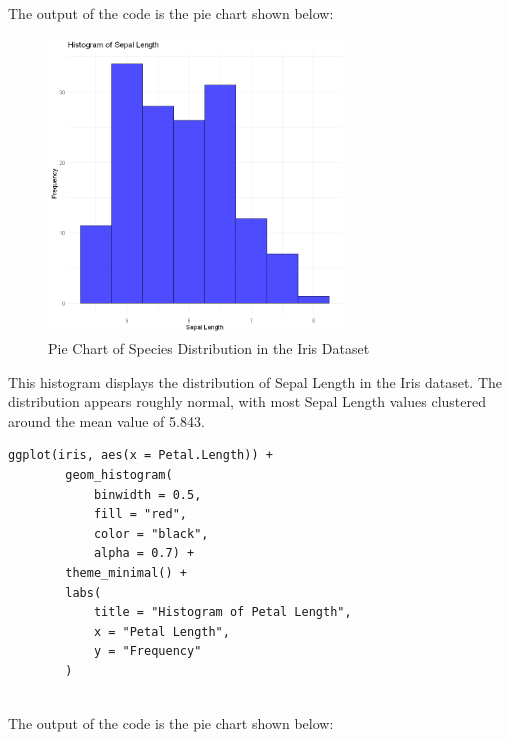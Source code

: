 \documentclass[a4paper,12pt]{article}
\begin{document}
    The output of the code is the pie chart shown below:
    
    \begin{figure}[h]
        \includegraphics[width=0.7\textwidth]{03.png}
        \caption{Pie Chart of Species Distribution in the Iris Dataset}
        \label{fig:pie_chart}
    \end{figure}
    This histogram displays the distribution of Sepal Length in the Iris dataset. The distribution appears roughly normal, with most Sepal Length values clustered around the mean value of 5.843.

    \newpage

    \begin{lstlisting}[style=RStyle]
        ggplot(iris, aes(x = Petal.Length)) +
        geom_histogram(
            binwidth = 0.5,
            fill = "red", 
            color = "black", 
            alpha = 0.7) +
        theme_minimal() +
        labs(
            title = "Histogram of Petal Length",
            x = "Petal Length",
            y = "Frequency"
        )
        
    \end{lstlisting}
        
    The output of the code is the pie chart shown below:
    
\end{document}
